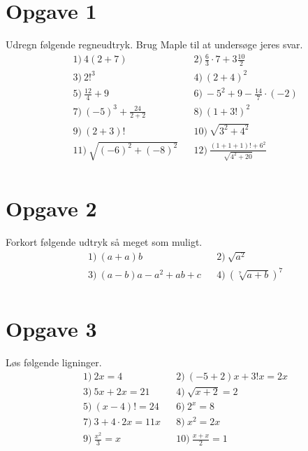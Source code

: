 \section*{Opgave 1}
Udregn følgende regneudtryk. Brug Maple til at undersøge jeres svar. 
\begin{align*}
	&1) \ 4(2+7)   &&2) \   \frac{6}{3}\cdot 7+3\frac{10}{2}  \\
	&3) \ 2!^3   &&4) \  (2+4)^2   \\
	&5) \  \frac{12}{4} +9 &&6) \  -5^2+9-\frac{14}{7}\cdot(-2)   \\
	&7) \ (-5)^3+\frac{24}{2+2}    &&8) \  (1+3!)^2   \\
	&9) \  (2+3)!  &&10) \  \sqrt{3^2+4^2}   \\
	&11) \ \sqrt{(-6)^2+(-8)^2}   &&12) \  \frac{(1+1+1)!+6^2}{\sqrt{4^2+20}}   \\
\end{align*}

\section*{Opgave 2}
Forkort følgende udtryk så meget som muligt.
\begin{align*}
	&1) \  (a+a)b  &&2) \  \sqrt{a^2}   \\
	&3) \  (a-b)a-a^2+ab+c  &&4) \ (\sqrt[7]{a+b})^7    \\
\end{align*}


\section*{Opgave 3}
Løs følgende ligninger.	
\begin{align*}
	&1) \  2x = 4  &&2) \ (-5+2)x+3!x = 2x   \\
	&3) \  5x+2x = 21  &&4) \ \sqrt{x+2} = 2   \\
	&5) \  (x-4)! = 24  &&6) \  2^x = 8  \\
	&7) \  3+4\cdot 2x = 11x  &&8) \ x^2 = 2x   \\
	&9) \  \frac{x^2}{3} = x  &&10) \  \frac{x+x}{2} = 1  \\	
\end{align*}
